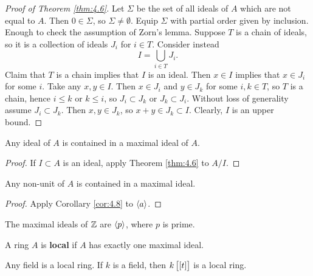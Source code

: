 \begin{proof}[Proof of Theorem \ref{thm:4.6}]
Let $ \Sigma $ be the set of all ideals of $ A $ which are not equal to $ A $. Then $ 0 \in \Sigma $, so $ \Sigma \ne \emptyset $. Equip $ \Sigma $ with partial order given by inclusion. Enough to check the assumption of Zorn's lemma. Suppose $ T $ is a chain of ideals, so it is a collection of ideals $ J_i $ for $ i \in T $. Consider instead
$$ I = \bigcup_{i \in T} J_i. $$
Claim that $ T $ is a chain implies that $ I $ is an ideal. Then $ x \in I $ implies that $ x \in J_i $ for some $ i $. Take any $ x, y \in I $. Then $ x \in J_i $ and $ y \in J_k $ for some $ i, k \in T $, so $ T $ is a chain, hence $ i \le k $ or $ k \le i $, so $ J_i \subset J_k $ or $ J_k \subset J_i $. Without loss of generality assume $ J_i \subset J_k $. Then $ x, y \in J_k $, so $ x + y \in J_k \subset I $. Clearly, $ I $ is an upper bound.
\end{proof}

\pagebreak

\begin{corollary}
\label{cor:4.8}
Any ideal of $ A $ is contained in a maximal ideal of $ A $.
\end{corollary}

\begin{proof}
If $ I \subset A $ is an ideal, apply Theorem \ref{thm:4.6} to $ A / I $.
\end{proof}

\begin{corollary}
\label{cor:4.9}
Any non-unit of $ A $ is contained in a maximal ideal.
\end{corollary}

\begin{proof}
Apply Corollary \ref{cor:4.8} to $ \left\langle a \right\rangle $.
\end{proof}

\begin{example*}
The maximal ideals of $ \mathbb{Z} $ are $ \left\langle p \right\rangle $, where $ p $ is prime.
\end{example*}

\begin{definition}
A ring $ A $ is \textbf{local} if $ A $ has exactly one maximal ideal.
\end{definition}

\begin{example*}
Any field is a local ring. If $ k $ is a field, then $ k\sbr{\sbr{t}} $ is a local ring.
\end{example*}

